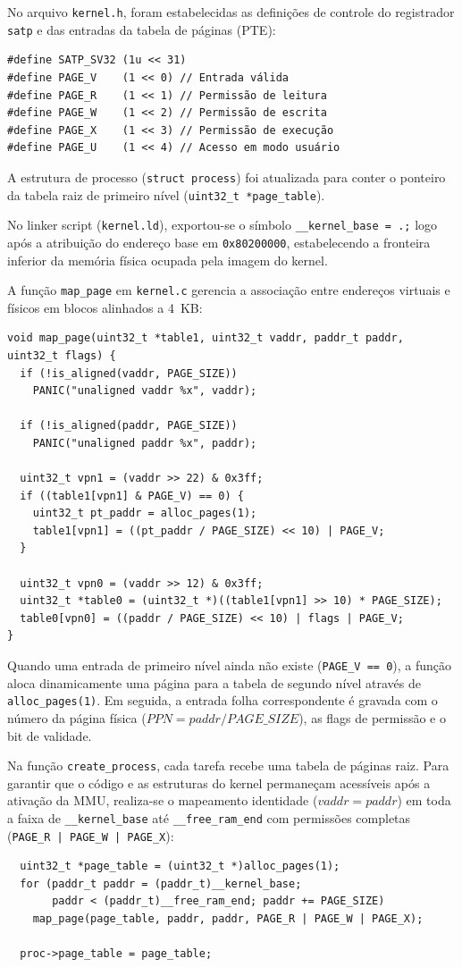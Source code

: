 \documentclass[12pt]{article}
\begin{document}
No arquivo \texttt{kernel.h}, foram estabelecidas as definições de controle do registrador \texttt{satp} e das entradas da tabela de páginas (PTE):
\begin{verbatim}
#define SATP_SV32 (1u << 31)
#define PAGE_V    (1 << 0) // Entrada válida
#define PAGE_R    (1 << 1) // Permissão de leitura
#define PAGE_W    (1 << 2) // Permissão de escrita
#define PAGE_X    (1 << 3) // Permissão de execução
#define PAGE_U    (1 << 4) // Acesso em modo usuário
\end{verbatim}

A estrutura de processo (\texttt{struct process}) foi atualizada para conter o ponteiro da tabela raiz de primeiro nível (\texttt{uint32\_t *page\_table}).

No linker script (\texttt{kernel.ld}), exportou-se o símbolo \texttt{\_\_kernel\_base = .;} logo após a atribuição do endereço base em \texttt{0x80200000}, estabelecendo a fronteira inferior da memória física ocupada pela imagem do kernel.

A função \texttt{map\_page} em \texttt{kernel.c} gerencia a associação entre endereços virtuais e físicos em blocos alinhados a 4~KB:
\begin{verbatim}
void map_page(uint32_t *table1, uint32_t vaddr, paddr_t paddr, uint32_t flags) {
  if (!is_aligned(vaddr, PAGE_SIZE))
    PANIC("unaligned vaddr %x", vaddr);

  if (!is_aligned(paddr, PAGE_SIZE))
    PANIC("unaligned paddr %x", paddr);

  uint32_t vpn1 = (vaddr >> 22) & 0x3ff;
  if ((table1[vpn1] & PAGE_V) == 0) {
    uint32_t pt_paddr = alloc_pages(1);
    table1[vpn1] = ((pt_paddr / PAGE_SIZE) << 10) | PAGE_V;
  }

  uint32_t vpn0 = (vaddr >> 12) & 0x3ff;
  uint32_t *table0 = (uint32_t *)((table1[vpn1] >> 10) * PAGE_SIZE);
  table0[vpn0] = ((paddr / PAGE_SIZE) << 10) | flags | PAGE_V;
}
\end{verbatim}

Quando uma entrada de primeiro nível ainda não existe (\texttt{PAGE\_V == 0}), a função aloca dinamicamente uma página para a tabela de segundo nível através de \texttt{alloc\_pages(1)}. Em seguida, a entrada folha correspondente é gravada com o número da página física ($PPN = paddr / PAGE\_SIZE$), as flags de permissão e o bit de validade.

Na função \texttt{create\_process}, cada tarefa recebe uma tabela de páginas raiz. Para garantir que o código e as estruturas do kernel permaneçam acessíveis após a ativação da MMU, realiza-se o mapeamento identidade ($vaddr = paddr$) em toda a faixa de \texttt{\_\_kernel\_base} até \texttt{\_\_free\_ram\_end} com permissões completas (\texttt{PAGE\_R | PAGE\_W | PAGE\_X}):
\begin{verbatim}
  uint32_t *page_table = (uint32_t *)alloc_pages(1);
  for (paddr_t paddr = (paddr_t)__kernel_base;
       paddr < (paddr_t)__free_ram_end; paddr += PAGE_SIZE)
    map_page(page_table, paddr, paddr, PAGE_R | PAGE_W | PAGE_X);

  proc->page_table = page_table;
\end{verbatim}
\end{document}
